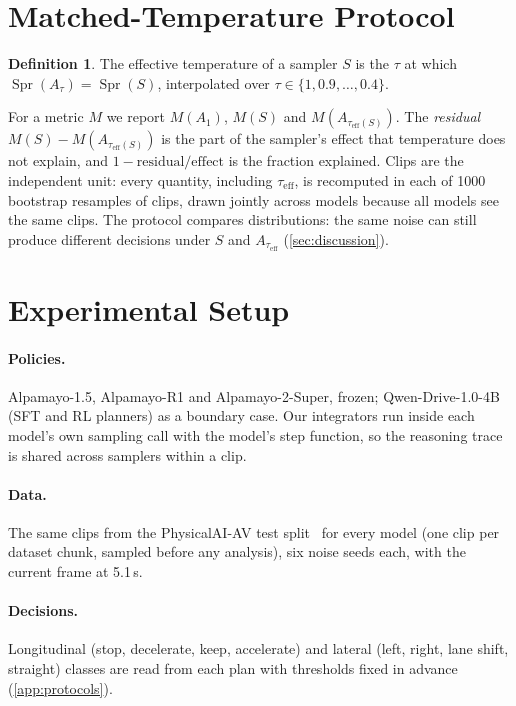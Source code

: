 \documentclass{article}
\theoremstyle{plain}
\theoremstyle{definition}
\newtheorem{definition}[theorem]{Definition}
\theoremstyle{remark}
\newcommand{\taueff}{\tau_{\mathrm{eff}}}
\newcommand{\Aref}{A_{1}}
\newcommand{\Atau}{A_{\tau}}
\newcommand{\Spr}{\operatorname{Spr}}
\begin{document}
\section{Matched-Temperature Protocol}
\label{sec:protocol}
\begin{definition}
The effective temperature of a sampler $S$ is the $\tau$ at which $\Spr(\Atau)=\Spr(S)$, interpolated over $\tau\in\{1,0.9,\dots,0.4\}$.
\end{definition}
For a metric $M$ we report $M(\Aref)$, $M(S)$ and $M(A_{\taueff(S)})$. The \emph{residual} $M(S)-M(A_{\taueff(S)})$ is the part of the sampler's effect that temperature does not explain, and $1-\text{residual}/\text{effect}$ is the fraction explained. Clips are the independent unit: every quantity, including $\taueff$, is recomputed in each of 1000 bootstrap resamples of clips, drawn jointly across models because all models see the same clips. The protocol compares distributions: the same noise can still produce different decisions under $S$ and $A_{\taueff}$ (\cref{sec:discussion}).

\section{Experimental Setup}
\label{sec:setup}
\paragraph{Policies.} Alpamayo-1.5, Alpamayo-R1 and Alpamayo-2-Super, frozen; Qwen-Drive-1.0-4B (SFT and RL planners) as a boundary case. Our integrators run inside each model's own sampling call with the model's step function, so the reasoning trace is shared across samplers within a clip.
\paragraph{Data.} The same \NClips{} clips from the PhysicalAI-AV test split~\citep{physicalai2026} for every model (one clip per dataset chunk, sampled before any analysis), six noise seeds each, with the current frame at 5.1\,s.
\paragraph{Decisions.} Longitudinal (stop, decelerate, keep, accelerate) and lateral (left, right, lane shift, straight) classes are read from each plan with thresholds fixed in advance (\cref{app:protocols}).
\end{document}
